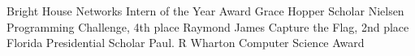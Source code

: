 %
%
%

\faAngleRight \space\space Bright House Networks Intern of the Year Award 
\space\space\space\space\space\space
\faAngleRight \space\space Grace Hopper Scholar
\hspace{1.1cm}
\faAngleRight \space\space Nielsen Programming Challenge, 4th place 
\newline
\faAngleRight \space\space Raymond James Capture the Flag, 2nd place 
\hspace{.7cm}
\faAngleRight \space\space Florida Presidential Scholar
\space\space\space\space\space\space
\faAngleRight \space\space Paul. R Wharton Computer Science Award